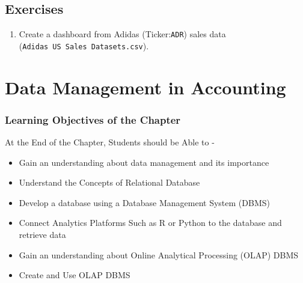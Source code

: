 \documentclass[
  letterpaper,
  DIV=11,
  numbers=noendperiod]{scrreprt}
\providecommand{\tightlist}{%
  \setlength{\itemsep}{0pt}\setlength{\parskip}{0pt}}
\begin{document}
\section{Exercises}\label{exercises}

\begin{enumerate}
\def\labelenumi{\arabic{enumi}.}
\tightlist
\item
  Create a dashboard from Adidas (Ticker:\texttt{ADR}) sales data
  (\texttt{Adidas\ US\ Sales\ Datasets.csv}).
\end{enumerate}

\chapter{Data Management in
Accounting}\label{data-management-in-accounting}

\subsection*{Learning Objectives of the
Chapter}\label{learning-objectives-of-the-chapter-5}

\begin{tcolorbox}[enhanced jigsaw, arc=.35mm, bottomrule=.15mm, bottomtitle=1mm, breakable, colback=white, colbacktitle=quarto-callout-note-color!10!white, colframe=quarto-callout-note-color-frame, coltitle=black, left=2mm, leftrule=.75mm, opacityback=0, opacitybacktitle=0.6, rightrule=.15mm, title=\textcolor{quarto-callout-note-color}{\faInfo}\hspace{0.5em}{Learning Objectives}, titlerule=0mm, toprule=.15mm, toptitle=1mm]

At the End of the Chapter, Students should be Able to -

\begin{itemize}
\item
  Gain an understanding about data management and its importance
\item
  Understand the Concepts of Relational Database
\item
  Develop a database using a Database Management System (DBMS)
\item
  Connect Analytics Platforms Such as R or Python to the database and
  retrieve data
\item
  Gain an understanding about Online Analytical Processing (OLAP) DBMS
\item
  Create and Use OLAP DBMS
\end{itemize}

\end{tcolorbox}
\end{document}
